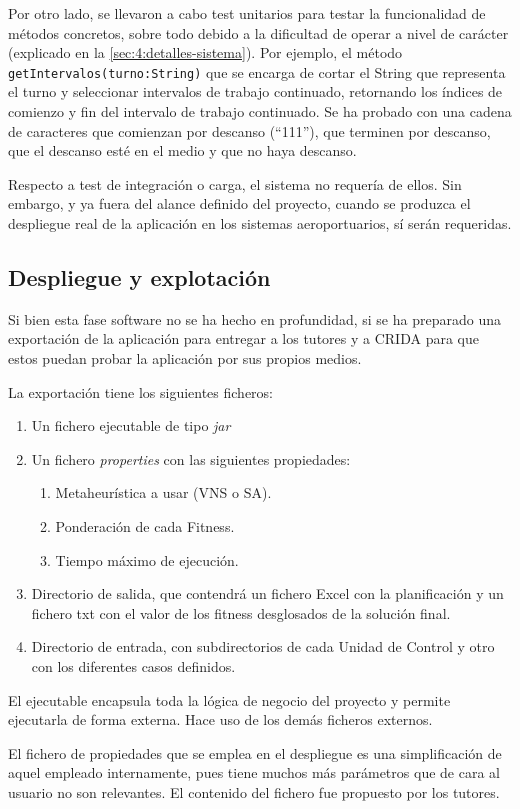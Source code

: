 Por otro lado, se llevaron a cabo test unitarios para testar la funcionalidad de métodos concretos, sobre todo debido a la dificultad de operar a nivel de carácter (explicado en la \autoref{sec:4:detalles-sistema}).
Por ejemplo, el método \texttt{getIntervalos(turno:String)} que se encarga de cortar el String que representa el turno y seleccionar intervalos de trabajo continuado, retornando los índices de comienzo y fin del intervalo de trabajo continuado. Se ha probado con una cadena de caracteres que comienzan por descanso (``111''), que terminen por descanso, que el descanso esté en el medio y que no haya descanso.

Respecto a test de integración o carga, el sistema no requería de ellos. Sin embargo, y ya fuera del alance definido del proyecto, cuando se produzca el despliegue real de la aplicación en los sistemas aeroportuarios, sí serán requeridas.

\subsection{Despliegue y explotación} 
\label{sec:4:despliegue}

Si bien esta fase software no se ha hecho en profundidad, si se ha preparado una exportación de la aplicación para entregar a los tutores y a \gls{CRIDA} para que estos puedan probar la aplicación por sus propios medios.

La exportación tiene los siguientes ficheros:
\begin{enumerate}
	\item Un fichero ejecutable de tipo \textit{jar}
	\item Un fichero \textit{properties} con las siguientes propiedades:
	\begin{enumerate}[label*={\arabic*}]
		\item Metaheurística a usar (VNS o SA).
		\item Ponderación de cada Fitness.
		\item Tiempo máximo de ejecución.
	\end{enumerate}
	\item Directorio de salida, que contendrá un fichero Excel con la planificación y un fichero txt con el valor de  los fitness desglosados de la solución final.
	\item Directorio de entrada, con subdirectorios de cada Unidad de Control y otro con los diferentes casos definidos.
\end{enumerate}

El ejecutable encapsula toda la lógica de negocio del proyecto y permite ejecutarla de forma externa. Hace uso de los demás ficheros externos.

El fichero de propiedades que se emplea en el despliegue es una simplificación de aquel empleado internamente, pues tiene muchos más parámetros que de cara al usuario no son relevantes. El contenido del fichero fue propuesto por los tutores.
